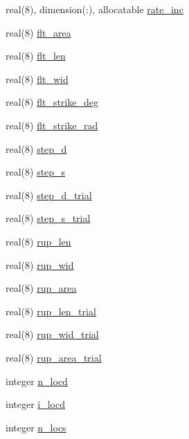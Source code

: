 \begin{DoxyCompactItemize}
real(8), dimension(\+:), allocatable \hyperlink{namespaceflt__module_af4abd22305b27392695e298e409485eb}{rate\+\_\+inc}
\item 
real(8) \hyperlink{namespaceflt__module_a5afcf609fce08da82c3c6f3c6ae623d1}{flt\+\_\+area}
\item 
real(8) \hyperlink{namespaceflt__module_a4bc1d05951c8d1ad1263099b2168fc52}{flt\+\_\+len}
\item 
real(8) \hyperlink{namespaceflt__module_a0a0ca2180f3d4b230a85f4e74898c1ab}{flt\+\_\+wid}
\item 
real(8) \hyperlink{namespaceflt__module_a5f628ae600d8550ab693d874d7a26bb0}{flt\+\_\+strike\+\_\+deg}
\item 
real(8) \hyperlink{namespaceflt__module_a618a9014909e559bdbedf80be8a159a3}{flt\+\_\+strike\+\_\+rad}
\item 
real(8) \hyperlink{namespaceflt__module_ad4dbd8fe640ed7c127b993e51b31c2cb}{step\+\_\+d}
\item 
real(8) \hyperlink{namespaceflt__module_aac3ac3d5dda31c71db0f70b6c04bde99}{step\+\_\+s}
\item 
real(8) \hyperlink{namespaceflt__module_a5a750dfe01760a5134b5cd98aa924b01}{step\+\_\+d\+\_\+trial}
\item 
real(8) \hyperlink{namespaceflt__module_abbc6ad6d8104d02669bab58b22654f6b}{step\+\_\+s\+\_\+trial}
\item 
real(8) \hyperlink{namespaceflt__module_aa83583fdd38e91b447b8fbf1ae9f833c}{rup\+\_\+len}
\item 
real(8) \hyperlink{namespaceflt__module_a5cbe7cb918ea3ecbe35270bdcc9ab63d}{rup\+\_\+wid}
\item 
real(8) \hyperlink{namespaceflt__module_aec90f89a37148a6fe2fa52df737b51ef}{rup\+\_\+area}
\item 
real(8) \hyperlink{namespaceflt__module_acb649d537953bd575e6bbded75b6c99b}{rup\+\_\+len\+\_\+trial}
\item 
real(8) \hyperlink{namespaceflt__module_a6cefaab59a5e1f02e62505b132fe9384}{rup\+\_\+wid\+\_\+trial}
\item 
real(8) \hyperlink{namespaceflt__module_af824d404f5d8ef8f21222c648b493389}{rup\+\_\+area\+\_\+trial}
\item 
integer \hyperlink{namespaceflt__module_a82fbb8ec3230fb344b2e8970e95398e3}{n\+\_\+locd}
\item 
integer \hyperlink{namespaceflt__module_ab114b19843b4c7f6c795898a67157717}{i\+\_\+locd}
\item 
integer \hyperlink{namespaceflt__module_a544a94f997804736b60b9989c7489732}{n\+\_\+locs}

\end{DoxyCompactItemize}
